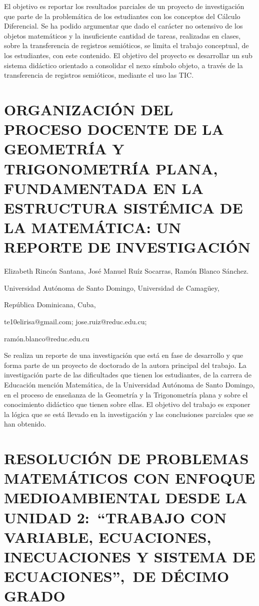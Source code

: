 El objetivo es reportar los resultados parciales de un proyecto de
investigación que parte de la problemática de los estudiantes con
los conceptos del Cálculo Diferencial. Se ha podido argumentar que
dado el carácter no ostensivo de los objetos matemáticos y la insuficiente
cantidad de tareas, realizadas en clases, sobre la transferencia de
registros semióticos, se limita el trabajo conceptual, de los estudiantes,
con este contenido. El objetivo del proyecto es desarrollar un sub
sistema didáctico orientado a consolidar el nexo símbolo objeto, a
través de la transferencia de registros semióticos, mediante el uso
las TIC.


\section{ORGANIZACIÓN DEL PROCESO DOCENTE DE LA GEOMETRÍA Y TRIGONOMETRÍA
PLANA, FUNDAMENTADA EN LA ESTRUCTURA SISTÉMICA DE LA MATEMÁTICA: UN
REPORTE DE INVESTIGACIÓN}

\begin{datos}

Elizabeth Rincón Santana, José Manuel Ruíz Socarras, Ramón Blanco
Sánchez.

Universidad Autónoma de Santo Domingo, Universidad de Camagüey,

República Dominicana, Cuba,

te10elirisa@gmail.com; jose.ruiz@reduc.edu.cu; 

ramón.blanco@reduc.edu.cu

\end{datos}

Se realiza un reporte de una investigación que está en fase de desarrollo
y que forma parte de un proyecto de doctorado de la autora principal
del trabajo. La investigación parte de las dificultades que tienen
los estudiantes, de la carrera de Educación mención Matemática, de
la Universidad Autónoma de Santo Domingo, en el proceso de enseñanza
de la Geometría y la Trigonometría plana y sobre el conocimiento didáctico
que tienen sobre ellas. El objetivo del trabajo es exponer la lógica
que se está llevado en la investigación y las conclusiones parciales
que se han obtenido. 


\section{RESOLUCIÓN DE PROBLEMAS MATEMÁTICOS CON ENFOQUE MEDIOAMBIENTAL DESDE
LA UNIDAD 2: “TRABAJO CON VARIABLE, ECUACIONES, INECUACIONES Y SISTEMA
DE ECUACIONES”, DE DÉCIMO GRADO}

